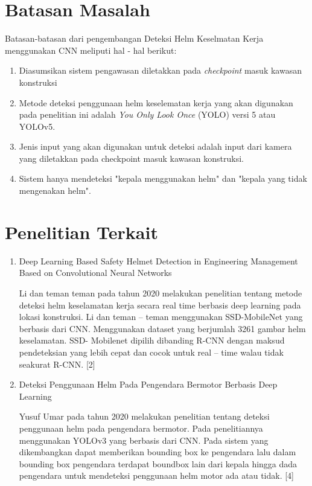 \section{Batasan Masalah}
\label{sec:batasanmasalah}

Batasan-batasan dari pengembangan Deteksi Helm Keselmatan Kerja menggunakan CNN meliputi hal - hal berikut:

\begin{enumerate}[nolistsep]

  \item Diasumsikan sistem pengawasan diletakkan pada \emph{checkpoint} masuk kawasan konstruksi

  \item Metode deteksi penggunaan helm keselematan kerja yang akan digunakan pada penelitian ini adalah \emph{You Only Look Once} (YOLO) versi 5 atau YOLOv5.

  \item Jenis input yang akan digunakan untuk deteksi adalah input dari kamera yang diletakkan pada checkpoint masuk kawasan konstruksi.
  \item Sistem hanya mendeteksi "kepala menggunakan helm" dan "kepala yang tidak mengenakan helm".

\end{enumerate}

\section{Penelitian Terkait}
\begin{enumerate}
  \item Deep Learning Based Safety Helmet Detection in Engineering Management Based on Convolutional Neural Networks 
  \par Li dan teman teman pada tahun 2020 melakukan penelitian tentang metode deteksi helm keselamatan kerja secara real time berbasis deep learning pada lokasi konstruksi. Li dan teman – teman menggunakan SSD-MobileNet yang berbasis dari CNN. Menggunakan dataset yang berjumlah 3261 gambar helm keselamatan. SSD- Mobilenet dipilih dibanding R-CNN dengan maksud pendeteksian yang lebih cepat dan cocok untuk real – time walau tidak seakurat R-CNN. [2]
  
  \item Deteksi Penggunaan Helm Pada Pengendara Bermotor Berbasis Deep Learning 
  \par Yusuf Umar pada tahun 2020 melakukan penelitian tentang deteksi penggunaan helm pada pengendara bermotor. Pada penelitiannya menggunakan YOLOv3 yang berbasis dari CNN. Pada sistem yang dikembangkan dapat memberikan bounding box ke pengendara lalu dalam bounding box pengendara terdapat boundbox lain dari kepala hingga dada pengendara untuk mendeteksi penggunaan helm motor ada atau tidak. [4]
\end{enumerate}

